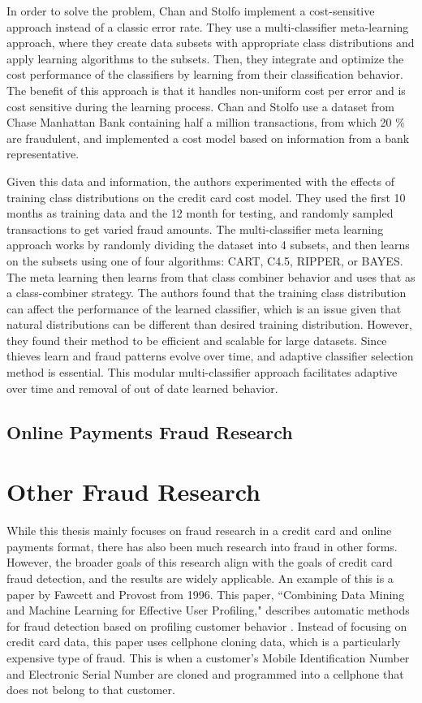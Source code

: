 \documentclass[midd]{thesis}
\begin{document}
In order to solve the problem, Chan and Stolfo implement a cost-sensitive approach instead of a classic error rate. They use a multi-classifier meta-learning approach, where they create data subsets with appropriate class distributions and apply learning algorithms to the subsets. Then, they integrate and optimize the cost performance of the classifiers by learning from their classification behavior. The benefit of this approach is that it handles non-uniform cost per error and is cost sensitive during the learning process. Chan and Stolfo use a dataset from Chase Manhattan Bank containing half a million transactions, from which 20 \% are fraudulent, and implemented a cost model based on information from a bank representative. 

Given this data and information, the authors experimented with the effects of training class distributions on the credit card cost model. They used the first 10 months as training data and the 12 month for testing, and randomly sampled transactions to get varied fraud amounts. The multi-classifier meta learning approach works by randomly dividing the dataset into 4 subsets, and then learns on the subsets using one of four algorithms: CART, C4.5, RIPPER, or BAYES. The meta learning then learns from that class combiner behavior and uses that as a class-combiner strategy. The authors found that the training class distribution can affect the performance of the learned classifier, which is an issue given that natural distributions can be different than desired training distribution. However, they found their method to be efficient and scalable for large datasets. Since thieves learn and fraud patterns evolve over time, and adaptive classifier selection method is essential. This modular multi-classifier approach facilitates adaptive over time and removal of out of date learned behavior.


\subsection{Online Payments Fraud Research}


\section{Other Fraud Research}

While this thesis mainly focuses on fraud research in a credit card and online payments format, there has also been much research into fraud in other forms. However, the broader goals of this research align with the goals of credit card fraud detection, and the results are widely applicable. An example of this is a paper by Fawcett and Provost from 1996. This paper, ``Combining Data Mining and Machine Learning for Effective User Profiling," describes automatic methods for fraud detection based on profiling customer behavior \cite{Fawcett1996}. Instead of focusing on credit card data, this paper uses cellphone cloning data, which is a particularly expensive type of fraud. This is when a customer's Mobile Identification Number and Electronic Serial Number are cloned and programmed into a cellphone that does not belong to that customer. 
\end{document}
